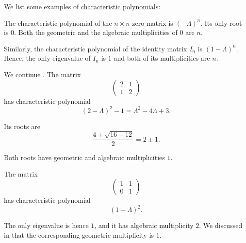 \begin{example}\label{ex:def:characteristic_polynomial}
  We list some examples of \hyperref[def:characteristic_polynomial]{characteristic polynomials}:
  \begin{thmenum}
     The characteristic polynomial of the \( n \times n \) zero matrix is \( (-\Lambda)^n \). Its only root is \( 0 \). Both the geometric and the algebraic multiplicities of \( 0 \) are \( n \).

     Similarly, the characteristic polynomial of the identity matrix \( I_n \) is \( (1 - \Lambda)^n \). Hence, the only eigenvalue of \( I_n \) is \( 1 \) and both of its multiplicities are \( n \).

     We continue . The matrix
    \begin{equation*}
      \begin{pmatrix}
        2 & 1 \\
        1 & 2
      \end{pmatrix}
    \end{equation*}
    has characteristic polynomial
    \begin{equation*}
      (2 - \Lambda)^2 - 1 = \Lambda^2 - 4\Lambda + 3.
    \end{equation*}

    Its roots are
    \begin{equation*}
      \frac {4 \pm \sqrt{16 - 12}} 2 = 2 \pm 1.
    \end{equation*}

    Both roots have geometric and algebraic multiplicities \( 1 \).

     The matrix
    \begin{equation*}
      \begin{pmatrix}
        1 & 1 \\
        0 & 1
      \end{pmatrix}
    \end{equation*}
    has characteristic polynomial
    \begin{equation*}
      (1 - \Lambda)^2.
    \end{equation*}

    The only eigenvalue is hence \( 1 \), and it has algebraic multiplicity \( 2 \). We discussed in  that the corresponding geometric multiplicity is \( 1 \).
  \end{thmenum}
\end{example}

